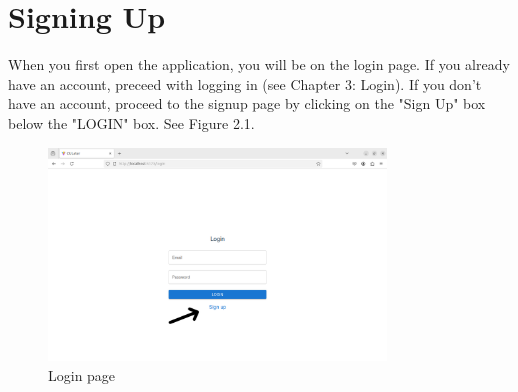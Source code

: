\documentclass{scrreprt}
\begin{document}
\chapter{Signing Up}

When you first open the application, you will be on the login page. If you already have an account, preceed with logging in (see Chapter 3: Login). If you don't have an account, proceed to the signup page by clicking on the "Sign Up" box below the "LOGIN" box. See Figure 2.1.\\
\begin{figure}[htbp]
        \centering
        \includegraphics[width=0.8\textwidth]{login_page_arrow_signup.png}
	\caption{Login page}
	\label{fig:my_label}
\end{figure}
\end{document}
